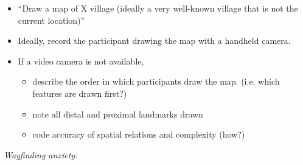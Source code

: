 \documentclass[idxtotoc,hyperref,openany]{labbook} %
\begin{document}


\begin{itemize}

\item ``Draw a map of X village (ideally a very well-known village that is not the current location)''

\item Ideally, record the participant drawing the map with a handheld camera.

\item If a video camera is not available, 
	\begin{itemize}

	\item describe the order in which participants draw the map. (i.e. which features are drawn first?)
	
	\item note all distal and proximal landmarks drawn
	
	\item code accuracy of spatial relations and complexity (how?)	
	\end{itemize}

 
\end{itemize}






\emph{Wayfinding anxiety:}
\end{document}
